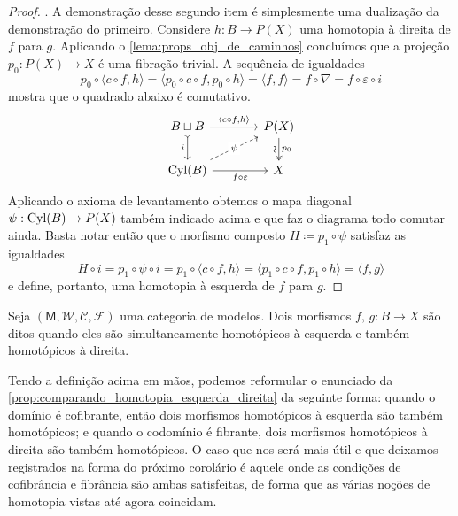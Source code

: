 \begin{proof}
  . A demonstração desse segundo item é simplesmente uma dualização da demonstração do primeiro.
  Considere $h: B \to P(X)$ uma homotopia à direita de $f$ para $g$.
  Aplicando o \cref{lema:props_obj_de_caminhos} concluímos que a projeção $p_{0}: P(X) \to X$ é uma fibração trivial.
  A sequência de igualdades
  \begin{displaymath}
    p_{0} \circ \langle c \circ f, h \rangle
    = \langle p_{0} \circ c \circ f, p_{0} \circ h \rangle
    = \langle f,f \rangle
    = f \circ \nabla
    = f \circ \varepsilon \circ i
  \end{displaymath}
  mostra que o quadrado abaixo é comutativo.
  \begin{displaymath}
    \begin{tikzcd}[column sep=1.3cm]
      B \sqcup B
      \arrow[r, "{\langle c \circ f, h \rangle}"]
      \arrow[d, tail, "i" swap]
      & P(X)
      \arrow[d, two heads, "p_{0}", "\sim" {swap, sloped}]
      \\ \Cyl(B)
      \arrow[ru,dashed, "\psi" description]
      \arrow[r, "f \circ \varepsilon" swap]
      & X
    \end{tikzcd}
  \end{displaymath}
  Aplicando o axioma de levantamento obtemos o mapa diagonal $\psi: \mathrm{Cyl}(B) \to P(X)$ também indicado acima e que faz o diagrama todo comutar ainda.
  Basta notar então que o morfismo composto $H \coloneqq p_{1} \circ \psi$ satisfaz as igualdades
  \begin{displaymath}
    H \circ i = p_{1} \circ \psi \circ i = p_{1} \circ \langle c \circ f,h \rangle = \langle p_{1} \circ c \circ f, p_{1} \circ h \rangle = \langle f,g \rangle
  \end{displaymath}
  e define, portanto, uma homotopia à esquerda de $f$ para $g$.
\end{proof}

\begin{defin}\label{defin:homotopia}
  Seja $(\mathsf{M},\mathcal{W},\mathcal{C},\mathcal{F})$ uma categoria de modelos.
  Dois morfismos $f,\,g: B \to X$ são ditos  quando eles são simultaneamente homotópicos à esquerda e também homotópicos à direita.
\end{defin}

Tendo a definição acima em mãos, podemos reformular o enunciado da \cref{prop:comparando_homotopia_esquerda_direita} da seguinte forma: quando o domínio é cofibrante, então dois morfismos homotópicos à esquerda são também homotópicos; e quando o codomínio é fibrante, dois morfismos homotópicos à direita são também homotópicos.
O caso que nos será mais útil e que deixamos registrados na forma do próximo corolário é aquele onde as condições de cofibrância e fibrância são ambas satisfeitas, de forma que as várias noções de homotopia vistas até agora coincidam.

